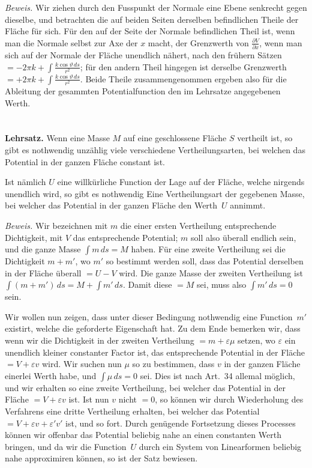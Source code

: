 \documentclass[12pt,a4paper]{article}
\begin{document}
\textit{Beweis.} Wir ziehen durch den Fusspunkt der Normale eine Ebene senkrecht
gegen dieselbe, und betrachten die auf beiden Seiten derselben befindlichen
Theile der Fläche für sich. Für den auf der Seite der Normale befindlichen
Theil ist, wenn man die Normale selbst zur Axe der $x$ macht, der Grenzwerth
von $\tfrac{\partial V}{\partial x}$, wenn man sich auf der Normale der Fläche unendlich nähert, nach den
frühern Sätzen $=-2\pi k + \int\tfrac{k\cos\vartheta\,ds}{r^2}$; für den andern Theil hingegen ist derselbe
Grenzwerth $=+2\pi k + \int\tfrac{k\cos\vartheta\,ds}{r^2}$. Beide Theile zusammengenommen ergeben also
für die Ableitung der gesammten Potentialfunction den im Lehrsatze angegebenen
Werth.

\section{}
\textbf{Lehrsatz.} Wenn eine Masse $M$ auf eine geschlossene Fläche $S$ vertheilt
ist, so gibt es nothwendig unzählig viele verschiedene Vertheilungsarten, bei welchen
das Potential in der ganzen Fläche constant ist.

Ist nämlich $U$ eine willkürliche Function der Lage auf der Fläche, welche
nirgends unendlich wird, so gibt es nothwendig Eine Vertheilungsart der gegebenen
Masse, bei welcher das Potential in der ganzen Fläche den Werth~$U$ annimmt.

\textit{Beweis.} Wir bezeichnen mit $m$ die einer ersten Vertheilung entsprechende
Dichtigkeit, mit $V$ das entsprechende Potential; $m$ soll also überall endlich sein,
und die ganze Masse $\int m\,ds=M$ haben. Für eine zweite Vertheilung sei die
Dichtigkeit $m+m'$, wo $m'$ so bestimmt werden soll, dass das Potential derselben
in der Fläche überall $=U-V$ wird. Die ganze Masse der zweiten Vertheilung
ist $\int(m+m')\,ds=M+\int m'\,ds$. Damit diese $=M$ sei, muss also $\int m'\,ds=0$ sein.

Wir wollen nun zeigen, dass unter dieser Bedingung nothwendig eine Function~$m'$
existirt, welche die geforderte Eigenschaft hat. Zu dem Ende bemerken wir,
dass wenn wir die Dichtigkeit in der zweiten Vertheilung $=m+\varepsilon\mu$ setzen, wo
$\varepsilon$ ein unendlich kleiner constanter Factor ist, das entsprechende Potential in der Fläche
$=V+\varepsilon v$ wird. Wir suchen nun $\mu$ so zu bestimmen, dass $v$ in der ganzen Fläche
einerlei Werth habe, und $\int\mu\,ds=0$ sei. Dies ist nach Art.~34 allemal möglich,
und wir erhalten so eine zweite Vertheilung, bei welcher das Potential in der
Fläche $=V+\varepsilon v$ ist. Ist nun $v$ nicht $=0$, so können wir durch Wiederholung
des Verfahrens eine dritte Vertheilung erhalten, bei welcher das Potential
$=V+\varepsilon v+\varepsilon' v'$ ist, und so fort. Durch genügende Fortsetzung dieses Processes
können wir offenbar das Potential beliebig nahe an einen constanten Werth
bringen, und da wir die Function~$U$ durch ein System von Linearformen beliebig
nahe approximiren können, so ist der Satz bewiesen.
\end{document}
